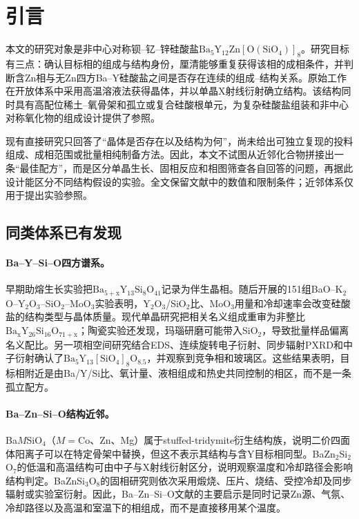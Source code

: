 \section{引言}
\label{sec:introduction}

本文的研究对象是非中心对称钡--钇--锌硅酸盐$\mathrm{Ba_5Y_{12}Zn[O(SiO_4)]_8}$。研究目标有三点：确认目标相的组成与结构身份，厘清能够重复获得该相的成相条件，并判断含Zn相与无Zn四方Ba--Y硅酸盐之间是否存在连续的组成--结构关系。原始工作在开放体系中采用高温溶液法获得晶体，并以单晶X射线衍射确立结构\cite{ababaikeri2024ba5y12zn}。该结构同时具有高配位稀土--氧骨架和孤立或复合硅酸根单元，为复杂硅酸盐组装和非中心对称氧化物的组成设计提供了参照。

现有直接研究只回答了“晶体是否存在以及结构为何”，尚未给出可独立复现的投料组成、成相范围或批量相纯制备方法\cite{ababaikeri2024ba5y12zn}。因此，本文不试图从近邻化合物拼接出一条“最佳配方”，而是区分单晶生长、固相反应和相图筛查各自回答的问题，再据此设计能区分不同结构假设的实验。全文保留文献中的数值和限制条件；近邻体系仅用于提出实验参照。

\subsection{同类体系已有发现}

\paragraph{Ba--Y--Si--O四方谱系。}
早期助熔生长实验把$\mathrm{Ba_{5+x}Y_{13}Si_8O_{41}}$记录为伴生晶相。随后开展的151组BaO--K$_2$O--Y$_2$O$_3$--SiO$_2$--MoO$_3$实验表明，Y$_2$O$_3$/SiO$_2$比、MoO$_3$用量和冷却速率会改变硅酸盐的结构类型与晶体质量\cite{kolitsch2009crystal,wierzbickawieczorek2017high}。现代单晶研究把相关名义组成重审为非整比$\mathrm{Ba_xY_{26}Si_{16}O_{71+x}}$；陶瓷实验还发现，玛瑙研磨可能带入SiO$_2$，导致批量样品偏离名义配比\cite{yamane2024synthesis,yamane2024microstructure}。另一项相空间研究结合EDS、连续旋转电子衍射、同步辐射PXRD和中子衍射确认了$\mathrm{Ba_5Y_{13}[SiO_4]_8O_{8.5}}$，并观察到竞争相和玻璃区\cite{gulay2024navigation}。这些结果表明，目标相附近是由Ba/Y/Si比、氧计量、液相组成和热史共同控制的相区，而不是一条孤立配方。

\paragraph{Ba--Zn--Si--O结构近邻。}
Ba$M$SiO$_4$（$M=$Co、Zn、Mg）属于stuffed-tridymite衍生结构族，说明二价四面体阳离子可以在特定骨架中替换，但这不表示其结构与含Y目标相同型\cite{liu1993structures}。BaZn$_2$Si$_2$O$_7$的低温和高温结构可由中子与X射线衍射区分，说明观察温度和冷却路径会影响结构判定\cite{lin1999phase}。BaZnSi$_3$O$_8$的固相研究则依次采用煅烧、压片、烧结、受控冷却及同步辐射或实验室衍射\cite{zou2021crystal}。因此，Ba--Zn--Si--O文献的主要启示是同时记录Zn源、气氛、冷却路径以及高温和室温下的相组成，而不是直接移用某个温度。

